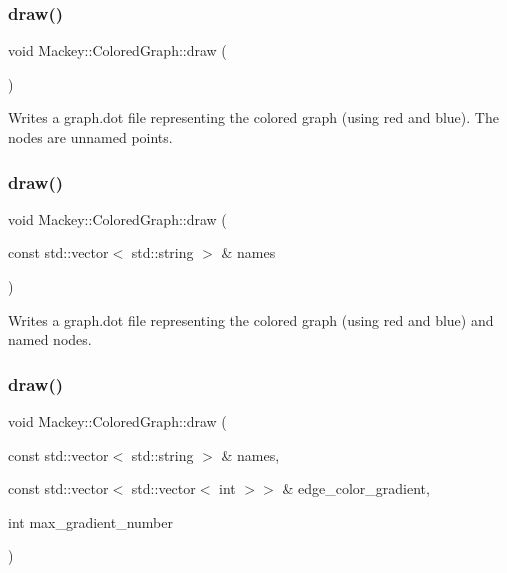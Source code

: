 \subsubsection{\texorpdfstring{draw()}{draw()}\hspace{0.1cm}{\footnotesize\ttfamily [1/4]}}
{\footnotesize\ttfamily void Mackey\+::\+Colored\+Graph\+::draw (\begin{DoxyParamCaption}{ }\end{DoxyParamCaption})}



Writes a graph.\+dot file representing the colored graph (using red and blue). The nodes are unnamed points. 

\mbox{\label{classMackey_1_1ColoredGraph_a912a6e5cb94386d9ff6510e968b41e7d}} 
\subsubsection{\texorpdfstring{draw()}{draw()}\hspace{0.1cm}{\footnotesize\ttfamily [2/4]}}
{\footnotesize\ttfamily void Mackey\+::\+Colored\+Graph\+::draw (\begin{DoxyParamCaption}\item[{const std\+::vector$<$ std\+::string $>$ \&}]{names }\end{DoxyParamCaption})}



Writes a graph.\+dot file representing the colored graph (using red and blue) and named nodes. 

\mbox{\label{classMackey_1_1ColoredGraph_a5368f26080615293e8c43657f61f9100}} 
\subsubsection{\texorpdfstring{draw()}{draw()}\hspace{0.1cm}{\footnotesize\ttfamily [3/4]}}
{\footnotesize\ttfamily void Mackey\+::\+Colored\+Graph\+::draw (\begin{DoxyParamCaption}\item[{const std\+::vector$<$ std\+::string $>$ \&}]{names,  }\item[{const std\+::vector$<$ std\+::vector$<$ int $>$$>$ \&}]{edge\+\_\+color\+\_\+gradient,  }\item[{int}]{max\+\_\+gradient\+\_\+number }\end{DoxyParamCaption})}



